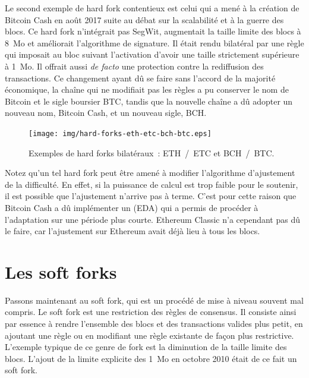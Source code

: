 Le second exemple de hard fork contentieux est celui qui a mené à la création de Bitcoin Cash en août 2017 suite au débat sur la scalabilité et à la guerre des blocs. Ce hard fork n'intégrait pas SegWit, augmentait la taille limite des blocs à 8~Mo et améliorait l'algorithme de signature. Il était rendu bilatéral par une règle qui imposait au bloc suivant l'activation d'avoir une taille strictement supérieure à 1~Mo. Il offrait aussi \emph{de facto} une protection contre la rediffusion des transactions. Ce changement ayant dû se faire sans l'accord de la majorité économique, la chaîne qui ne modifiait pas les règles a pu conserver le nom de Bitcoin et le sigle boursier BTC, tandis que la nouvelle chaîne a dû adopter un nouveau nom, Bitcoin Cash, et un nouveau sigle, BCH.

\begin{figure}[h]
  \centering
  \texttt{[image: img/hard-forks-eth-etc-bch-btc.eps]}
  \caption{Exemples de hard forks bilatéraux~: ETH~/~ETC et BCH~/~BTC.}
  \label{fig:hard-forks-eth-bch}
\end{figure}

Notez qu'un tel hard fork peut être amené à modifier l'algorithme d'ajustement de la difficulté. En effet, si la puissance de calcul est trop faible pour le soutenir, il est possible que l'ajustement n'arrive pas à terme. C'est pour cette raison que Bitcoin Cash a dû implémenter un  (EDA) qui a permis de procéder à l'adaptation sur une période plus courte. Ethereum Classic n'a cependant pas dû le faire, car l'ajustement sur Ethereum avait déjà lieu à tous les blocs.

\section*{Les soft forks}

Passons maintenant au soft fork, qui est un procédé de mise à niveau souvent mal compris. Le soft fork est une restriction des règles de consensus. Il consiste ainsi par essence à rendre l'ensemble des blocs et des transactions valides plus petit, en ajoutant une règle ou en modifiant une règle existante de façon plus restrictive. L'exemple typique de ce genre de fork est la diminution de la taille limite des blocs. L'ajout de la limite explicite des 1~Mo en octobre 2010 était de ce fait un soft fork.

